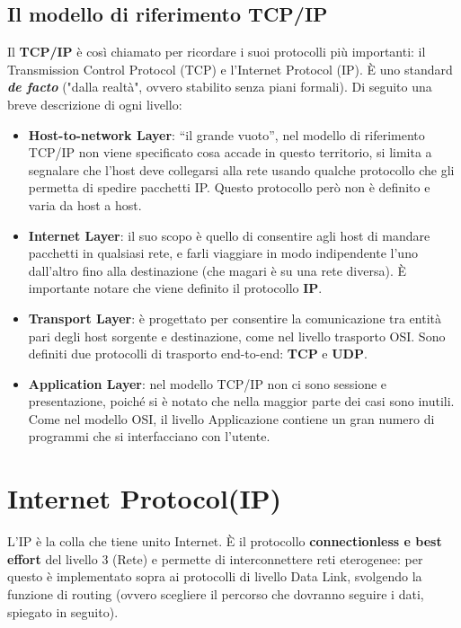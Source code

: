 \documentclass{article}
\begin{document}
        \subsection{Il modello di riferimento TCP/IP}
        Il \textbf{TCP/IP} è così chiamato per ricordare i suoi protocolli più importanti: il Transmission Control
        Protocol (TCP) e l'Internet Protocol (IP). È uno standard \textbf{\textit{de facto}} ("dalla realtà", ovvero
        stabilito senza piani formali). Di seguito una breve descrizione di ogni livello:
        \begin{itemize}
        
            \item \textbf{Host-to-network Layer}: “il grande vuoto”, nel modello di riferimento TCP/IP non viene
                specificato cosa accade in questo territorio, si limita a segnalare che l’host deve collegarsi alla
                rete usando qualche protocollo che gli permetta di spedire pacchetti IP. Questo protocollo però
                non è definito e varia da host a host.
                
            \item \textbf{Internet Layer}: il suo scopo è quello di consentire agli host di mandare pacchetti in qualsiasi
                rete, e farli viaggiare in modo indipendente l’uno dall’altro fino alla destinazione (che magari è
                su una rete diversa). È importante notare che viene definito il protocollo \textbf{IP}.
            
            \item \textbf{Transport Layer}: è progettato per consentire la comunicazione tra entità pari degli host
                sorgente e destinazione, come nel livello trasporto OSI. Sono definiti due protocolli di trasporto
                end-to-end: \textbf{TCP} e \textbf{UDP}.

            \item \textbf{Application Layer}: nel modello TCP/IP non ci sono sessione e presentazione, poiché si è notato
                che nella maggior parte dei casi sono inutili. Come nel modello OSI, il livello Applicazione
                contiene un gran numero di programmi che si interfacciano con l’utente.
        \end{itemize}

    \section{Internet Protocol(IP)}
    L’IP è la colla che tiene unito Internet. È il protocollo \textbf{connectionless e best effort} del livello 3
    (Rete) e permette di interconnettere reti eterogenee: per questo è implementato sopra ai
    protocolli di livello Data Link, svolgendo la funzione di routing (ovvero scegliere il percorso che
    dovranno seguire i dati, spiegato in seguito).
        
\end{document}

